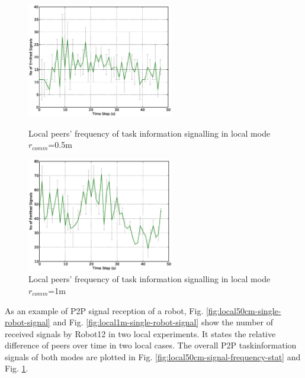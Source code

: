 \documentclass[letterpaper, 10 pt, conference]{ieeeconf}  %
\begin{document}
\begin{figure}
\begin{minipage}[t]{0.5\linewidth}
\centering
\includegraphics[height=5cm, angle=0]
{images/local-500cm/Local-500cm-SignalingFreqStat.eps}
\caption{\small Local peers' frequency of task information signalling in local mode $r_{comm}$=0.5m}
\label{fig:local50cm-signal-frequency-stat} %
\end{minipage}
\hspace{0.5cm}
\begin{minipage}[t]{0.5\linewidth}
\centering
\includegraphics[height=5cm, angle=0]{images/local-1m/Local-1m-SignalingFreqStat.eps}
\caption{\small Local peers' frequency of task information signalling in local mode $r_{comm}$=1m}
\label{fig:local1cm-signal-frequency-stat} %
\end{minipage}
\end{figure}
%
As an example of P2P signal reception of a robot, Fig. \ref{fig:local50cm-single-robot-signal} and Fig. \ref{fig:local1m-single-robot-signal} show the number of received signals by Robot12 in two local experiments. It states the relative difference of peers over time in two local cases. The overall P2P taskinformation signals of both modes are plotted in Fig. \ref{fig:local50cm-signal-frequency-stat} and Fig. \ref{fig:local1cm-signal-frequency-stat}.  
\end{document}
